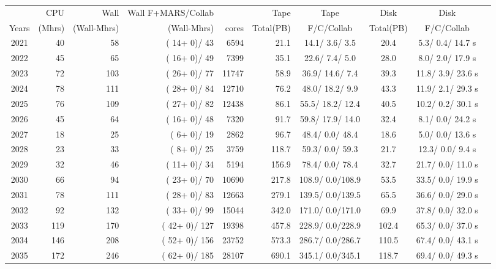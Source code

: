 \documentclass[12pt]{article}
\begin{document}
\begin{table}
\footnotesize
 \centering \begin{tabular}[h]{crrrrrcccc}
 & CPU &Wall&Wall F+MARS/Collab&\qquad  & Tape\qquad& Tape\qquad  & Disk\qquad  & Disk\qquad \\
Years&(Mhrs)&(Wall-Mhrs)&(Wall-Mhrs)&cores& Total(PB)&F/C/Collab & Total(PB) &F/C/Collab\\
\hline
2021&	  40&	  58&	(  14+   0)/  43&	  6594&	     21.1&	  14.1/  3.6/  3.5&	     20.4&	   5.3/  0.4/ 14.7 s\\
2022&	  45&	  65&	(  16+   0)/  49&	  7399&	     35.1&	  22.6/  7.4/  5.0&	     28.0&	   8.0/  2.0/ 17.9 s\\
2023&	  72&	 103&	(  26+   0)/  77&	 11747&	     58.9&	  36.9/ 14.6/  7.4&	     39.3&	  11.8/  3.9/ 23.6 s\\
2024&	  78&	 111&	(  28+   0)/  84&	 12710&	     76.2&	  48.0/ 18.2/  9.9&	     43.3&	  11.9/  2.1/ 29.3 s\\
2025&	  76&	 109&	(  27+   0)/  82&	 12438&	     86.1&	  55.5/ 18.2/ 12.4&	     40.5&	  10.2/  0.2/ 30.1 s\\
2026&	  45&	  64&	(  16+   0)/  48&	  7320&	     91.7&	  59.8/ 17.9/ 14.0&	     32.4&	   8.1/  0.0/ 24.2 s\\
2027&	  18&	  25&	(   6+   0)/  19&	  2862&	     96.7&	  48.4/  0.0/ 48.4&	     18.6&	   5.0/  0.0/ 13.6 s\\
2028&	  23&	  33&	(   8+   0)/  25&	  3759&	    118.7&	  59.3/  0.0/ 59.3&	     21.7&	  12.3/  0.0/  9.4 s\\
2029&	  32&	  46&	(  11+   0)/  34&	  5194&	    156.9&	  78.4/  0.0/ 78.4&	     32.7&	  21.7/  0.0/ 11.0 s\\
2030&	  66&	  94&	(  23+   0)/  70&	 10690&	    217.8&	 108.9/  0.0/108.9&	     53.5&	  33.5/  0.0/ 19.9 s\\
2031&	  78&	 111&	(  28+   0)/  83&	 12663&	    279.1&	 139.5/  0.0/139.5&	     65.5&	  36.6/  0.0/ 29.0 s\\
2032&	  92&	 132&	(  33+   0)/  99&	 15044&	    342.0&	 171.0/  0.0/171.0&	     69.9&	  37.8/  0.0/ 32.0 s\\
2033&	 119&	 170&	(  42+   0)/ 127&	 19398&	    457.8&	 228.9/  0.0/228.9&	    102.4&	  65.3/  0.0/ 37.0 s\\
2034&	 146&	 208&	(  52+   0)/ 156&	 23752&	    573.3&	 286.7/  0.0/286.7&	    110.5&	  67.4/  0.0/ 43.1 s\\
2035&	 172&	 246&	(  62+   0)/ 185&	 28107&	    690.1&	 345.1/  0.0/345.1&	    118.7&	  69.4/  0.0/ 49.3 s\\

\end{tabular}
\end{table}
\end{document}

